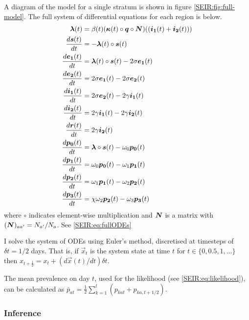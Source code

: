 \documentclass[thesis.tex]{subfiles}
\begin{document}
A diagram of the model for a single stratum is shown in figure \cref{SEIR:fig:full-model}.
The full system of differential equations for each region is below.
\begin{equation}
\begin{aligned}
    \bm{\lambda}(t) &= \beta(t) (\bm{\kappa}(t) \circ \bm{q} \circ \bm{N}) ((\bm{i_1}(t) + \bm{i_2}(t))) \\
    \frac{d\bm{s}(t)}{dt} &= -\bm{\lambda}(t) \circ \bm{s}(t) \\
    \frac{d\bm{e_1}(t)}{dt} &= \bm{\lambda}(t) \circ \bm{s}(t) - 2\sigma \bm{e_1}(t) \\
    \frac{d\bm{e_2}(t)}{dt} &= 2\sigma \bm{e_1}(t) - 2\sigma \bm{e_2}(t) \\
    \frac{d\bm{i_1}(t)}{dt} &= 2\sigma \bm{e_2}(t) - 2\gamma \bm{i_1}(t) \\
    \frac{d\bm{i_2}(t)}{dt} &= 2\gamma \bm{i_1}(t) - 2\gamma \bm{i_2}(t) \\
    \frac{d\bm{r}(t)}{dt} &= 2\gamma \bm{i_2}(t) \\
    \frac{d\bm{p_0}(t)}{dt} &= \bm{\lambda} \circ \bm{s}(t) - \omega_0 \bm{p_0}(t) \\
    \frac{d\bm{p_1}(t)}{dt} &= \omega_0 \bm{p_0}(t) - \omega_1 \bm{p_1}(t) \\
    \frac{d\bm{p_2}(t)}{dt} &= \omega_1 \bm{p_1}(t) - \omega_{2} \bm{p_2}(t) \\
    \frac{d\bm{p_3}(t)}{dt} &= \chi \omega_{2} \bm{p_2}(t) - \omega_{3} \bm{p_3}(t)
\end{aligned}
\label{SEIR:eq:fullODEs}
\end{equation}
where $\circ$ indicates element-wise multiplication and $\bm{N}$ is a matrix with $(\bm{N})_{aa'} = N_{a'} / N_{a}$.
See \cref{SEIR:eq:fullODEs}

I solve the system of ODEs using Euler's method, discretised at timesteps of $\delta t = 1/2$ days.
That is, if $\vec{x}_t$ is the system state at time $t$ for $t \in \{ 0, 0.5, 1, \dots \}$ then $x_{t+\frac{1}{2}} = x_t + (d\vec{x}(t)/dt) \delta t$.

The mean prevalence on day $t$, used for the likelihood (see \cref{SEIR:eq:likelihood}), can be calculated as $\bar{p}_{at} = \frac{1}{2} \sum_{k=1}^l ( p_{kat} + p_{ka,t+1/2} )$.

\subsubsection{Inference} \label{SEIR:sec:inference}
\end{document}

